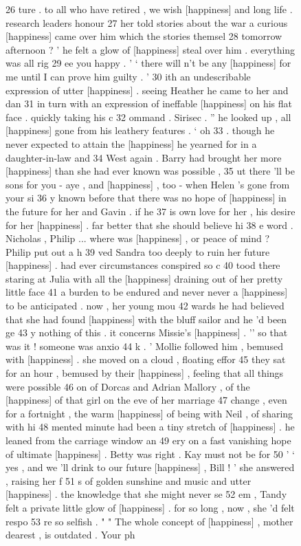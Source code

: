 \begin{figure}
\begin{fitverb}
26 ture . to all who have retired , we wish [happiness] and long life . research leaders honour
27 her told stories about the war a curious [happiness] came over him which the stories themsel
28 tomorrow afternoon ? ' he felt a glow of [happiness] steal over him . everything was all rig
29 ee you happy . ' ` there will n't be any [happiness] for me until I can prove him guilty . '
30 ith an undescribable expression of utter [happiness] . seeing Heather he came to her and dan
31  in turn with an expression of ineffable [happiness] on his flat face . quickly taking his c
32 ommand . Sirisec . '' he looked up , all [happiness] gone from his leathery features . ` oh
33 . though he never expected to attain the [happiness] he yearned for in a daughter-in-law and
34  West again . Barry had brought her more [happiness] than she had ever known was possible ,
35 ut there 'll be sons for you - aye , and [happiness] , too - when Helen 's gone from your si
36 y known before that there was no hope of [happiness] in the future for her and Gavin . if he
37 is own love for her , his desire for her [happiness] . far better that she should believe hi
38 e word . Nicholas , Philip ... where was [happiness] , or peace of mind ? Philip put out a h
39 ved Sandra too deeply to ruin her future [happiness] . had ever circumstances conspired so c
40 tood there staring at Julia with all the [happiness] draining out of her pretty little face
41 a burden to be endured and never never a [happiness] to be anticipated . now , her young mou
42 wards he had believed that she had found [happiness] with the bluff sailor and he 'd been ge
43 y nothing of this . it concerns Missie's [happiness] . '' so that was it ! someone was anxio
44 k . ' Mollie followed him , bemused with [happiness] . she moved on a cloud , floating effor
45  they sat for an hour , bemused by their [happiness] , feeling that all things were possible
46 on of Dorcas and Adrian Mallory , of the [happiness] of that girl on the eve of her marriage
47 change , even for a fortnight , the warm [happiness] of being with Neil , of sharing with hi
48 mented minute had been a tiny stretch of [happiness] . he leaned from the carriage window an
49 ery on a fast vanishing hope of ultimate [happiness] . Betty was right . Kay must not be for
50 ' ` yes , and we 'll drink to our future [happiness] , Bill ! ' she answered , raising her f
51 s of golden sunshine and music and utter [happiness] . the knowledge that she might never se
52 em , Tandy felt a private little glow of [happiness] . for so long , now , she 'd felt respo
53 re so selfish . " " The whole concept of [happiness] , mother dearest , is outdated . Your ph
\end{fitverb}
\vspace{-\baselineskip}\hrulefill
\end{figure}

